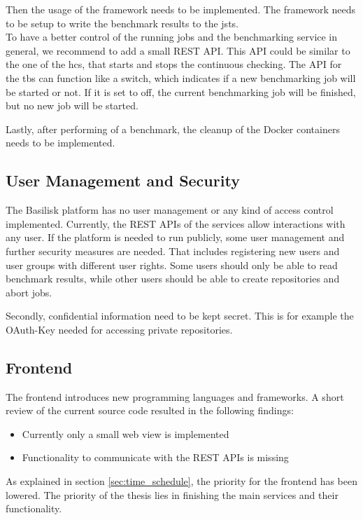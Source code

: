 Then the usage of the \iguana{} framework needs to be implemented.
The framework needs to be setup to write the benchmark results to the \acl{jsts}.
\\

To have a better control of the running jobs and the benchmarking service in general, we recommend to add a small REST API.
This API could be similar to the one of the \ac{hcs}, that starts and stops the continuous checking.
The API for the \ac{tbs} can function like a switch, which indicates if a new benchmarking job will be started or not.
If it is set to off, the current benchmarking job will be finished, but no new job will be started.

Lastly, after performing of a benchmark, the cleanup of the Docker containers needs to be implemented.

\subsection{User Management and Security}
\label{sec:review_user_management}
The Basilisk platform has no user management or any kind of access control implemented.
Currently, the REST APIs of the services allow interactions with any user.
If the platform is needed to run publicly, some user management and further security measures are needed.
That includes registering new users and user groups with different user rights.
Some users should only be able to read benchmark results, while other users should be able to create repositories and abort jobs.

Secondly, confidential information need to be kept secret.
This is for example the OAuth-Key needed for accessing private \gh{} repositories.


\subsection{Frontend}
\label{sec:review_frontend}
The frontend introduces new programming languages and frameworks.
A short review of the current source code resulted in the following findings:
\begin{itemize}
	\item Currently only a small web view is implemented
	\item Functionality to communicate with the REST APIs is missing
\end{itemize}


As explained in section \ref{sec:time_schedule}, the priority for the frontend has been lowered.
The priority of the thesis lies in finishing the main services and their functionality.

